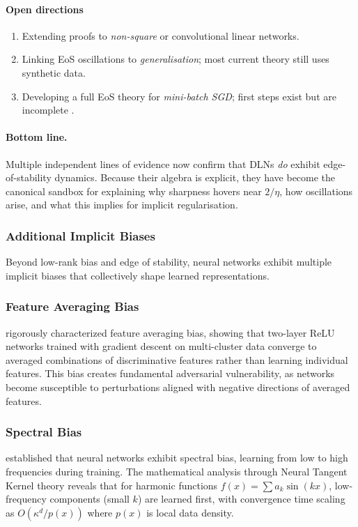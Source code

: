\documentclass[11pt]{article}
\begin{document}
\paragraph{Open directions}

\begin{enumerate}
\item Extending proofs to \emph{non-square} or convolutional linear
      networks. 
\item Linking EoS oscillations to \emph{generalisation}; most current
      theory still uses synthetic data. 
\item Developing a full EoS theory for \emph{mini-batch SGD}; first
      steps exist but are incomplete \citep{Kalra2023Universal}. 
\end{enumerate}

\paragraph{Bottom line.}
Multiple independent lines of evidence now confirm that DLNs \emph{do}
exhibit edge-of-stability dynamics.  Because their algebra is explicit,
they have become the canonical sandbox for explaining why sharpness
hovers near $2/\eta$, how oscillations arise, and what this implies for
implicit regularisation.

\subsubsection*{Additional Implicit Biases}

Beyond low-rank bias and edge of stability, neural networks exhibit multiple implicit biases that collectively shape learned representations.

\subsubsection{Feature Averaging Bias}
\citet{li2024feature} rigorously characterized feature averaging bias, showing that two-layer ReLU networks trained with gradient descent on multi-cluster data converge to averaged combinations of discriminative features rather than learning individual features. This bias creates fundamental adversarial vulnerability, as networks become susceptible to perturbations aligned with negative directions of averaged features.

\subsubsection{Spectral Bias}
\citet{rahaman2019spectral} established that neural networks exhibit spectral bias, learning from low to high frequencies during training. The mathematical analysis through Neural Tangent Kernel theory reveals that for harmonic functions $f(x) = \sum a_k \sin(kx)$, low-frequency components (small $k$) are learned first, with convergence time scaling as $O(\kappa^d/p(x))$ where $p(x)$ is local data density.
\end{document}
